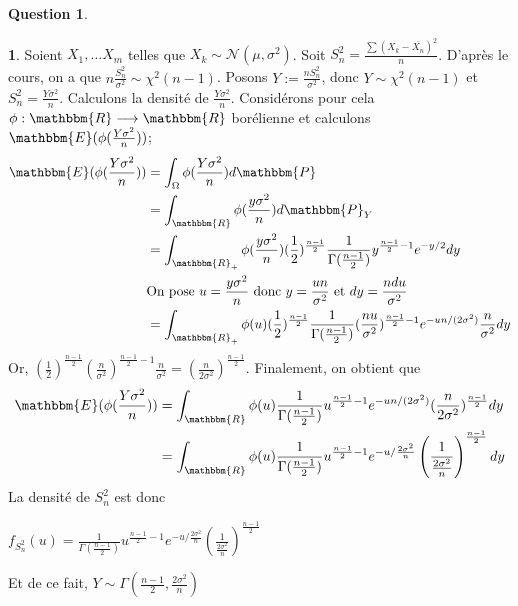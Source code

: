 \documentclass[12pt]{article}
\newcommand{\R}{\mathbbm{R}}
\newcommand{\1}{\mathbbm{1}}
\newcommand{\E}{\mathbbm{E}}
\newcommand{\Prob}{\mathbbm{P}}
\newcommand{\Nc}{\mathcal{N}}
\theoremstyle{definition}\newtheorem{defn}{Définition}
\theoremstyle{definition}\newtheorem{exm}{Exemple}
\theoremstyle{definition}\newtheorem{rem}{Remarque}
\theoremstyle{definition}\newtheorem{algo}{Algorithme}
\theoremstyle{remark}\newtheorem{exo}{Exercice}
\theoremstyle{remark}\newtheorem{nota}{Notation}
\theoremstyle{definition}\newtheorem{1q}{Question}
\theoremstyle{definition}\newtheorem{2q}{Question}
\theoremstyle{definition}\newtheorem{3q}{Question}
\theoremstyle{definition}\newtheorem{4q}{Question}
\theoremstyle{definition}\newtheorem{2qs1}{}
\theoremstyle{definition}\newtheorem{2qs2}{}
\theoremstyle{definition}\newtheorem{2qs3}{}
\theoremstyle{definition}\newtheorem{2qs4}{}
\theoremstyle{definition}\newtheorem{4qs2}{}
\theoremstyle{definition}\newtheorem{4qs3}{}
\begin{document}
\begin{2q}
\begin{2qs2}
Soient $X_1, \ldots X_m$ telles que $X_k \sim \Nc(\mu, \sigma^2)$. Soit $S_n^2 = \displaystyle\frac{\sum(X_k - \overline{X_n})^2}{n}$.\newline
D'après le cours, on a que $\displaystyle n\frac{S_n^2}{\sigma^2} \sim \chi^2(n-1)$.\newline
Posons $\displaystyle Y:=\frac{nS_n^2}{\sigma^2}$, donc $Y\sim\chi^2(n-1)$ et $S_n^2=\frac{Y\sigma^2}{n}$. \newline
Calculons la densité de $\displaystyle\frac{Y\sigma^2}{n}$. \newline
Considérons pour cela $\phi :\R \longrightarrow\R$ borélienne et calculons $\E(\phi(\frac{Y\sigma^2}{n}))$;
\begin{align*}
\E(\phi(\frac{Y\sigma^2}{n})) &= \int_{\Omega}\phi(\frac{Y\sigma^2}{n})d\Prob\\
&= \int_{\R}\phi(\frac{y\sigma^2}{n})d\Prob_Y\\
&=\displaystyle \int_{\R_+}\phi(\frac{y\sigma^2}{n}) (\frac{1}{2})^{ \frac{n-1}{2}}\frac{1}{\Gamma( \frac{n-1}{2})}y^{ \frac{n-1}{2} -1}e^{-y/2}dy\\
& \text{On pose $u=\frac{y\sigma^2}{n}$ donc $y=\frac{un}{\sigma^2}$ et $dy=\frac{ndu}{\sigma^2}$}\\
&= \displaystyle \int_{\R_+}\phi(u) (\frac{1}{2})^{ \frac{n-1}{2}}\frac{1}{\Gamma( \frac{n-1}{2})}(\frac{nu}{\sigma^2})^{ \frac{n-1}{2} -1}e^{-un/(2\sigma^2)}\frac{n}{\sigma^2}dy\\
\end{align*}
Or, $\displaystyle\left(\frac{1}{2}\right)^{ \frac{n-1}{2}}(\frac{n}{\sigma^2})^{ \frac{n-1}{2} -1}\frac{n}{\sigma^2} = (\frac{n}{2\sigma^2})^{ \frac{n-1}{2}}$.\newline
Finalement, on obtient que
\begin{align*}
\E(\phi(\frac{Y\sigma^2}{n})) &= \displaystyle \int_{\R}\phi(u)\frac{1}{\Gamma( \frac{n-1}{2})}u^{ \frac{n-1}{2} -1}e^{-un/(2\sigma^2)}(\frac{n}{2\sigma^2})^{ \frac{n-1}{2}}dy\\
&= \displaystyle \int_{\R}\phi(u)\frac{1}{\Gamma( \frac{n-1}{2})}u^{ \frac{n-1}{2} -1}e^{-u/\frac{2\sigma^2}{n}}\left(\frac{1}{\frac{2\sigma^2}{n}}\right)^{ \frac{n-1}{2}}dy
\end{align*}
La densité de $S_n^2$ est donc
\begin{center}$\displaystyle f_{S_n^2}(u)=\frac{1}{\Gamma( \frac{n-1}{2})}u^{ \frac{n-1}{2} -1}e^{-u/\frac{2\sigma^2}{n}}\left(\frac{1}{\frac{2\sigma^2}{n}}\right)^{ \frac{n-1}{2}}$\end{center}
Et de ce fait, $Y\sim \Gamma( \frac{n-1}{2}, \frac{2\sigma^2}{n})$
\end{2qs2}
\end{2q}
\end{document}
